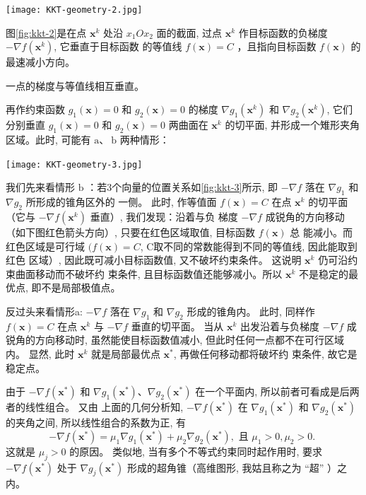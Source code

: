 \begin{FigureCenter}{}
    \label{fig:kkt-2}
    \texttt{[image: KKT-geometry-2.jpg]}
\end{FigureCenter}

图\ref{fig:kkt-2}是在点 $ \mathbf{x}^{k} $ 处沿 $ x_{1} O x_{2} $ 面的截面, 过点 $ \mathbf{x}^{k} $ 作目标函数的负梯度 $ -\nabla f\left(\mathbf{x}^{k}\right) $, 它垂直于目标函数 的等值线 $ f(\mathbf{x})=C $ ，且指向目标函数 $ f(\mathbf{x}) $ 的最速减小方向。

\begin{corollary}
    一点的梯度与等值线相互垂直。
\end{corollary}

再作约束函数 $ g_{1}(\mathbf{x})=0 $ 和 $ g_{2}(\mathbf{x})=0 $ 的梯度 $ \nabla g_{1}\left(\mathbf{x}^{k}\right) $ 和 $ \nabla g_{2}\left(\mathbf{x}^{k}\right) $, 它们分别垂直 $ g_{1}(\mathbf{x})=0 $ 和 $ g_{2}(\mathbf{x})=0 $ 两曲面在 $ \mathbf{x}^{k} $ 的切平面, 并形成一个雉形夹角区域。此时, 可能有 $ \mathrm{a} 、 \mathrm{~b} $ 两种情形：

\begin{FigureCenter}{}
    \label{fig:kkt-3}
    \texttt{[image: KKT-geometry-3.jpg]}
\end{FigureCenter}

我们先来看情形 $\mathrm{b}$ ：若3个向量的位置关系如\ref{fig:kkt-3}所示, 即 $-\nabla f$ 落在 $\nabla g_{1}$ 和 $\nabla g_{2}$ 所形成的锥角区外的 一侧。 此时, 作等值面 $f(\mathbf{x})=C$ 在点 $\mathbf{x}^{k}$ 的切平面（它与 $-\nabla f\left(\mathbf{x}^{k}\right)$ 垂直）, 我们发现：沿着与负 梯度 $-\nabla f$ 成锐角的方向移动（如下图红色箭头方向）, 只要在红色区域取值, 目标函数 $f(\mathbf{x})$ 总 能减小。而红色区域是可行域 $(f(\mathbf{x})=C$, C取不同的常数能得到不同的等值线, 因此能取到红色 区域）, 因此既可减小目标函数值, 又不破坏约束条件。 这说明 $\mathbf{x}^{k}$ 仍可沿约束曲面移动而不破坏约 束条件, 且目标函数值还能够减小。所以 $\mathbf{x}^{k}$ 不是稳定的最优点, 即不是局部极值点。

反过头来看情形a: $ -\nabla f $ 落在 $ \nabla g_{1} $ 和 $ \nabla g_{2} $ 形成的锥角内。 此时, 同样作 $ f(\mathbf{x})=C $ 在点 $ \mathbf{x}^{k} $ 与 $ -\nabla f $ 垂直的切平面。 当从 $ \mathbf{x}^{k} $ 出发沿着与负梯度 $ -\nabla f $ 成锐角的方向移动时, 虽然能使目标函数值减小, 但此时任何一点都不在可行区域内。 显然, 此时 $ \mathbf{x}^{k} $ 就是局部最优点 $ \mathbf{x}^{*} $, 再做任何移动都将破坏约 束条件, 故它是稳定点。

由于 $ -\nabla f\left(\mathbf{x}^{*}\right) $ 和 $ \nabla g_{1}\left(\mathbf{x}^{*}\right) 、 \nabla g_{2}\left(\mathbf{x}^{*}\right) $ 在一个平面内, 所以前者可看成是后两者的线性组合。 又由 上面的几何分析知, $ -\nabla f\left(\mathbf{x}^{*}\right) $ 在 $ \nabla g_{1}\left(\mathbf{x}^{*}\right) $ 和 $ \nabla g_{2}\left(\mathbf{x}^{*}\right) $ 的夹角之间, 所以线性组合的系数为正, 有
$$
-\nabla f\left(\mathbf{x}^{*}\right)=\mu_{1} \nabla g_{1}\left(\mathbf{x}^{*}\right)+\mu_{2} \nabla g_{2}\left(\mathbf{x}^{*}\right), \text { 且 } \mu_{1}>0, \mu_{2}>0 \text {. }
$$
这就是 $ \mu_{j}>0 $ 的原因。 类似地, 当有多个不等式约束同时起作用时, 要求 $ -\nabla f\left(\mathbf{x}^{*}\right) $ 处于 $ \nabla g_{j}\left(\mathbf{x}^{*}\right) $ 形成的超角锥（高维图形, 我姑且称之为 “超” ）之内。


